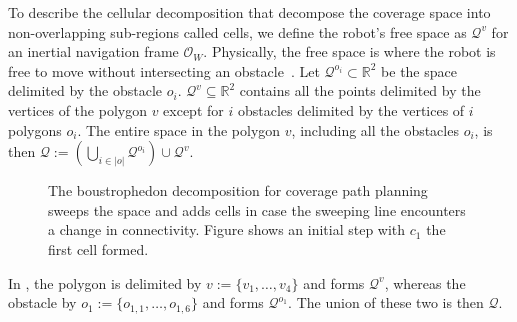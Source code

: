 To describe the cellular decomposition that decompose the coverage space into non-overlapping sub-regions called cells, we define the robot's free space as $\mathcal{Q}^v$ for an inertial navigation frame $\mathcal{O}_W$. Physically, the free space is where the robot is free to move without intersecting an obstacle~\citep{choset2005principles}. Let $\mathcal{Q}^{o_i}\subset\mathbb{R}^2$ be the space delimited by the obstacle $o_i$. $\mathcal{Q}^v\subseteq\mathbb{R}^2$ contains all the points delimited by the vertices of the polygon $v$ except for $i$ obstacles delimited by the vertices of $i$ polygons $o_i$. The entire space in the polygon $v$, including all the obstacles $o_i$, is then $\mathcal{Q}:=(\bigcup_{i\in|o|}\mathcal{Q}^{o_i})\cup\mathcal{Q}^v$. 
\begin{figure}[h]
  \centering
  \selectfont
  
  \caption[Initial step of the boustrophedon decomposition]{The boustrophedon decomposition for coverage path planning sweeps the space and adds cells in case the sweeping line encounters a change in connectivity. Figure shows an initial step with $c_1$ the first cell formed.}
  \label{fig:bcd2}
\end{figure}
In , the polygon is delimited by $v:=\{v_1,\dots,v_4\}$ and forms $\mathcal{Q}^v$, whereas the obstacle by $o_1:=\{o_{1,1},\dots,o_{1,6}\}$ and forms $\mathcal{Q}^{o_1}$. The union of these two is then $\mathcal{Q}$.

